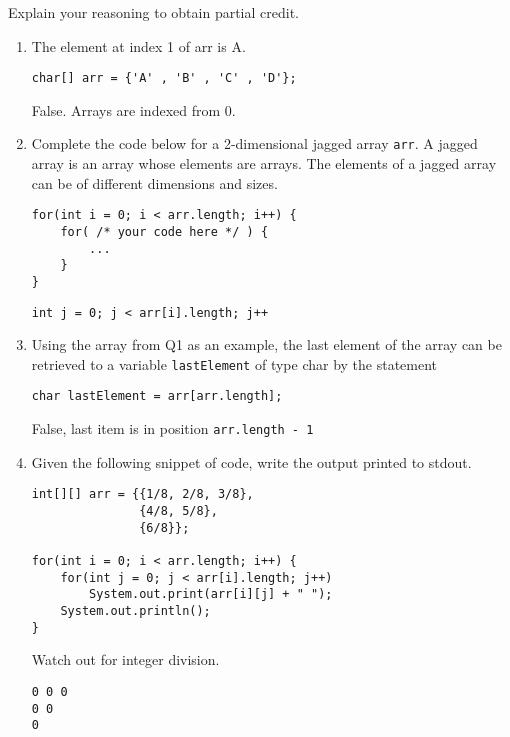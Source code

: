 \Instructions
   Explain your reasoning to obtain partial credit.
\begin{enumerate}
    
\item {} \tf The element at index 1 of arr is A.
\begin{lstlisting}
char[] arr = {'A' , 'B' , 'C' , 'D'};
\end{lstlisting}
\Ans False. Arrays are indexed from 0.

\item {} Complete the code below for a 2-dimensional jagged array \texttt{arr}. A jagged array is an array whose elements are arrays. The elements of a jagged array can be of different dimensions and sizes. 
\begin{lstlisting}
for(int i = 0; i < arr.length; i++) {
	for( /* your code here */ ) {
    	...
    }
}
\end{lstlisting}
\Ans \texttt{int j = 0; j < arr[i].length; j++}
 
\item {} \tf Using the array from Q1 as an example, the last element of the array can be retrieved to a variable \texttt{lastElement} of type char by the statement
\begin{lstlisting}
char lastElement = arr[arr.length];
\end{lstlisting}
\Ans False, last item is in position \texttt{arr.length - 1}

\item {} Given the following snippet of code, write the output printed to stdout. 

\begin{lstlisting}
int[][] arr = {{1/8, 2/8, 3/8},
			   {4/8, 5/8},
			   {6/8}};

for(int i = 0; i < arr.length; i++) {
	for(int j = 0; j < arr[i].length; j++)
		System.out.print(arr[i][j] + " ");
	System.out.println();
}
\end{lstlisting}

\Ans Watch out for integer division. 
\begin{lstlisting}
0 0 0
0 0
0
\end{lstlisting}

\clearpage

\clearpage
\ifdraft \clearpage \fi

\end{enumerate}   
